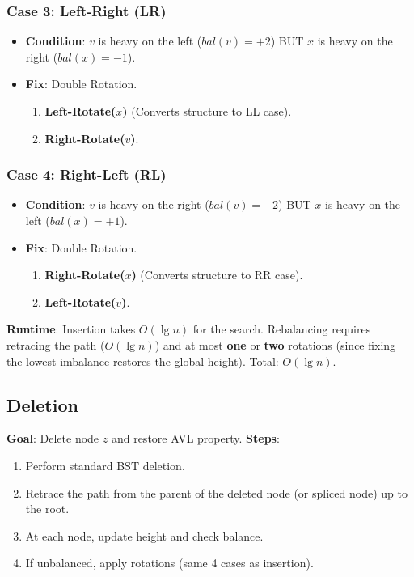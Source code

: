 \documentclass[12pt]{article}
\theoremstyle{blueplain}
\theoremstyle{bluedef}
\theoremstyle{blueremark}
\begin{document}
\subsubsection{Case 3: Left-Right (LR)}
\begin{itemize}
    \item \textbf{Condition}: $v$ is heavy on the left ($bal(v) = +2$) BUT $x$ is heavy on the right ($bal(x) = -1$).
    \item \textbf{Fix}: Double Rotation.
          \begin{enumerate}
              \item \textbf{Left-Rotate($x$)} (Converts structure to LL case).
              \item \textbf{Right-Rotate($v$)}.
          \end{enumerate}
\end{itemize}

\subsubsection{Case 4: Right-Left (RL)}
\begin{itemize}
    \item \textbf{Condition}: $v$ is heavy on the right ($bal(v) = -2$) BUT $x$ is heavy on the left ($bal(x) = +1$).
    \item \textbf{Fix}: Double Rotation.
          \begin{enumerate}
              \item \textbf{Right-Rotate($x$)} (Converts structure to RR case).
              \item \textbf{Left-Rotate($v$)}.
          \end{enumerate}
\end{itemize}

\noindent \textbf{Runtime}: Insertion takes $O(\lg n)$ for the search. Rebalancing requires retracing the path ($O(\lg n)$) and at most \textbf{one} or \textbf{two} rotations (since fixing the lowest imbalance restores the global height). Total: $O(\lg n)$.

\subsection{Deletion}

\textbf{Goal}: Delete node $z$ and restore AVL property.
\textbf{Steps}:
\begin{enumerate}
    \item Perform standard BST deletion.
    \item Retrace the path from the parent of the deleted node (or spliced node) up to the root.
    \item At each node, update height and check balance.
    \item If unbalanced, apply rotations (same 4 cases as insertion).
\end{enumerate}
\end{document}
